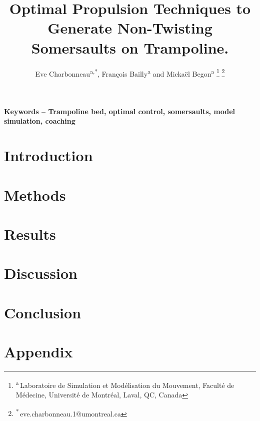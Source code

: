 \documentclass[preprint,12pt]{elsarticle}  %
\title{\LARGE \bf
Optimal Propulsion Techniques to Generate Non-Twisting Somersaults on Trampoline.
}
\author{Eve Charbonneau\textsuperscript{a,*}, François Bailly\textsuperscript{a} and Mickaël Begon\textsuperscript{a}%
\thanks{\textsuperscript{a}\,Laboratoire de Simulation et Modélisation du Mouvement, Faculté de Médecine, Université de Montréal, Laval, QC, Canada}%
\thanks{\textsuperscript{*}\,eve.charbonneau.1@umontreal.ca}
}
\begin{document}
\thispagestyle{empty}
\pagestyle{empty}



\maketitle

\textbf{Keywords -- Trampoline bed, optimal control,  somersaults, model simulation, coaching}

\section{Introduction}\label{sec:introduction}


\section{Methods}\label{sec:methods}


\section{Results}\label{sec:results}


\section{Discussion}\label{sec:discussion}


\section{Conclusion}\label{sec:conclusion}


 


\clearpage

\begingroup
\let\clearpage\relax 
\onecolumn 
\section{Appendix}\label{sec:appendix}

\endgroup
\end{document}
